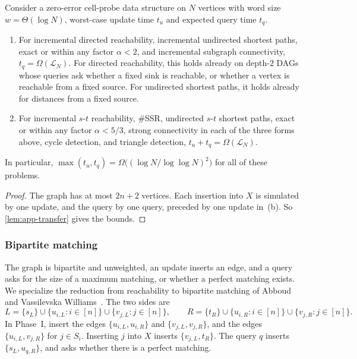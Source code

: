 \begin{corollary}\label{thm:reach}
Consider a zero-error cell-probe data structure on $N$ vertices with word size $w=\Theta(\log N)$, worst-case update time $t_u$ and expected query time $t_q$.
\begin{enumerate}[label=(\alph*), leftmargin=*]
  \item For incremental directed reachability, incremental undirected shortest paths, exact or within any factor $\alpha<2$, and incremental subgraph connectivity, $t_q=\Omega(\mathcal L_N)$. For directed reachability, this holds already on depth-$2$ DAGs whose queries ask whether a fixed sink is reachable, or whether a vertex is reachable from a fixed source. For undirected shortest paths, it holds already for distances from a fixed source.
  \item For incremental $s$-$t$ reachability, \#SSR, undirected $s$-$t$ shortest paths, exact or within any factor $\alpha<5/3$, strong connectivity in each of the three forms above, cycle detection, and triangle detection, $t_u+t_q=\Omega(\mathcal L_N)$.
\end{enumerate}
In particular, $\max(t_u,t_q)=\Omega\big((\log N/\log\log N)^2\big)$ for all of these problems.
\end{corollary}
\begin{proof}
The graph has at most $2n+2$ vertices. Each insertion into $X$ is simulated by one update, and the query by one query, preceded by one update in~(b). So \cref{lem:app-transfer} gives the bounds.
\end{proof}

\subsubsection{Bipartite matching}\label{sec:bipartite-matching}

The graph is bipartite and unweighted, an update inserts an edge, and a query asks for the size of a maximum matching, or whether a perfect matching exists. We specialize the reduction from reachability to bipartite matching of Abboud and Vassilevska Williams~\cite[Lemma~6.2]{abboud_popular_2014}. The two sides are
\[
 L=\{s_L\}\cup\{u_{i,L}:i\in[n]\}\cup\{v_{j,L}:j\in[n]\},
 \qquad
 R=\{t_R\}\cup\{u_{i,R}:i\in[n]\}\cup\{v_{j,R}:j\in[n]\}.
\]
In Phase~I, insert the edges $\{u_{i,L},u_{i,R}\}$ and $\{v_{j,L},v_{j,R}\}$, and the edges $\{u_{i,L},v_{j,R}\}$ for $j\in S_i$. Inserting $j$ into $X$ inserts $\{v_{j,L},t_R\}$. The query $q$ inserts $\{s_L,u_{q,R}\}$, and asks whether there is a perfect matching.

